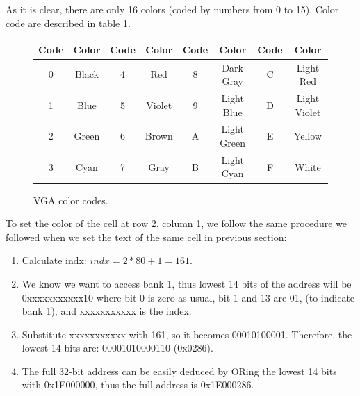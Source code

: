 \documentclass[oneside]{book}
\begin{document}
As it is clear, there are only 16 colors (coded by numbers from 0 to 15).
Color code are described in table \ref{colormap}.

\begin{figure}[H]
\begin{center}
\begin{tabular}{|c|c|c|c|c|c|c|c|}

\hline \textbf{Code} & \textbf{Color} &
       \textbf{Code} & \textbf{Color} &
       \textbf{Code} & \textbf{Color} &
       \textbf{Code} & \textbf{Color} \\


\hline 0 & \cellcolor{black}\color{white} Black        &
       4 & \cellcolor{red}\color{white}   Red          &
       8 & \cellcolor{darkgray}\color{white} Dark Gray    &
       C & \cellcolor{red!60}\color{white} Light Red    \\
\hline 1 & \cellcolor{blue}\color{white} Blue         &
       5 & \cellcolor{violet}\color{white} Violet       &
       9 & \cellcolor{blue!60}\color{white} Light Blue   &
       D & \cellcolor{violet!60}\color{white} Light Violet \\
\hline 2 & \cellcolor{green}\color{white} Green        &
       6 & \cellcolor{brown}\color{white} Brown        &
       A & \cellcolor{green!60}\color{black} Light Green  &
       E & \cellcolor{yellow}\color{black} Yellow       \\
\hline 3 & \cellcolor{cyan}\color{white} Cyan         &
       7 & \cellcolor{gray}\color{white} Gray         &
       B & \cellcolor{cyan!60}\color{black} Light Cyan   &
       F & \cellcolor{white}\color{black} White        \\

\hline

\end{tabular}
\end{center}
\caption{VGA color codes.}
\label{colormap}
\end{figure}

To set the color of the cell at row 2, column 1, we follow the same procedure
we followed when we set the text of the same cell in previous section:

\begin{enumerate}

\item Calculate indx: $indx=2*80+1=161$.
\item We know we want to access bank 1, thus lowest 14 bits of the address
      will be 0xxxxxxxxxxx10 where bit 0 is zero as usual, bit 1 and 13 are 01,
      (to indicate bank 1), and xxxxxxxxxxx is the index.
\item Substitute xxxxxxxxxxx with 161, so it becomes 00010100001. Therefore,
      the lowest 14 bits are: 00001010000110 (0x0286).
\item The full 32-bit address can be easily deduced by ORing the lowest 14 bits
      with 0x1E000000, thus the full address is 0x1E000286.

\end{enumerate}
\end{document}
